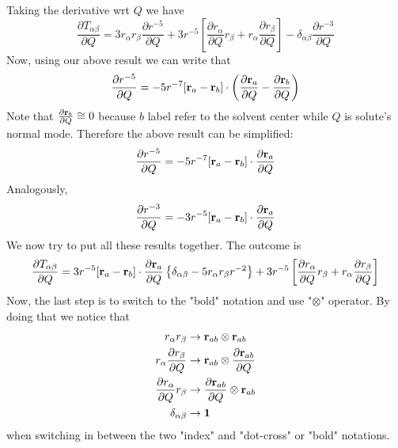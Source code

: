 \documentclass{exam}
\newcommand{\fderiv}[2]{\ensuremath{
\frac{\partial #1}{\partial #2}}}
\begin{document}
\begin{questions}
\begin{solution}
Taking the derivative wrt $Q$ we have
%
\begin{equation}
 \fderiv{T_{\alpha\beta}}{Q} = 
 3r_\alpha r_\beta \fderiv{r^{-5}}{Q} + 
 3r^{-5} \left[ \fderiv{r_\alpha}{Q} r_\beta  + r_\alpha \fderiv{r_\beta}{Q} \right]
    - \delta_{\alpha\beta} \fderiv{r^{-3}}{Q}
\end{equation}
%
Now, using our above result we can write that
%
\begin{equation}
 \fderiv{r^{-5}}{Q} = -5r^{-7} [ {\bf r}_a - {\bf r}_b ] \cdot \left(\fderiv{{\bf r}_a}{Q} - \fderiv{{\bf r}_b}{Q}\right)
\end{equation}
%
Note that $\fderiv{{\bf r}_b}{Q}\cong 0$ because $b$ label
refer to the solvent center while $Q$ is solute's normal mode. 
Therefore the above result can be simplified:
%
\begin{equation}
 \fderiv{r^{-5}}{Q} = -5r^{-7} [ {\bf r}_a - {\bf r}_b ] \cdot \fderiv{{\bf r}_a}{Q} 
\end{equation}
%
Analogously,
%
\begin{equation}
 \fderiv{r^{-3}}{Q} = -3r^{-5} [ {\bf r}_a - {\bf r}_b ] \cdot \fderiv{{\bf r}_a}{Q} 
\end{equation}
%
We now try to put all these results together. The outcome is
%
\begin{equation}
 \fderiv{T_{\alpha\beta}}{Q} = 3 r^{-5} [ {\bf r}_a - {\bf r}_b ] \cdot \fderiv{{\bf r}_a}{Q} 
 \left\{ 
   \delta_{\alpha\beta} - 5 r_\alpha r_\beta r^{-2}
 \right\}
 + 
 3r^{-5} \left[ \fderiv{r_\alpha}{Q} r_\beta  + r_\alpha \fderiv{r_\beta}{Q} \right]
\end{equation}
%
Now, the last step is to switch to the "bold" notation and use "$\otimes$"
operator. By doing that we notice that
%
\begin{subequations}
\begin{align}
 r_\alpha r_\beta                &\rightarrow {\bf r}_{ab} \otimes {\bf r}_{ab} \\
 r_\alpha \fderiv{r_\beta}{Q}    &\rightarrow {\bf r}_{ab} \otimes \fderiv{{\bf r}_{ab}}{Q} \\
 \fderiv{r_\alpha}{Q} r_\beta    &\rightarrow \fderiv{{\bf r}_{ab}}{Q} \otimes {\bf r}_{ab} \\
 \delta_{\alpha\beta}            &\rightarrow {\bf 1}
\end{align}
\end{subequations}
%
when switching in between the two "index" and "dot-cross" or "bold" notations.

\end{solution}
\end{questions}
\end{document}
